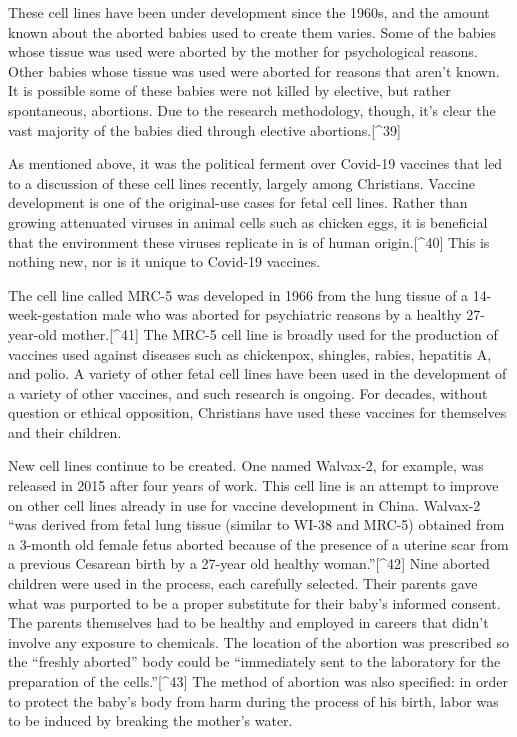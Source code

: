 \documentclass[
]{book}
\begin{document}
These cell lines have been under development since the 1960s, and the amount known about the aborted babies used to create them varies. Some of the babies whose tissue was used were aborted by the mother for psychological reasons. Other babies whose tissue was used were aborted for reasons that aren't known. It is possible some of these babies were not killed by elective, but rather spontaneous, abortions. Due to the research methodology, though, it's clear the vast majority of the babies died through elective abortions.{[}\^{}39{]}

As mentioned above, it was the political ferment over Covid-19 vaccines that led to a discussion of these cell lines recently, largely among Christians. Vaccine development is one of the original-use cases for fetal cell lines. Rather than growing attenuated viruses in animal cells such as chicken eggs, it is beneficial that the environment these viruses replicate in is of human origin.{[}\^{}40{]} This is nothing new, nor is it unique to Covid-19 vaccines.

The cell line called MRC-5 was developed in 1966 from the lung tissue of a 14-week-gestation male who was aborted for psychiatric reasons by a healthy 27-year-old mother.{[}\^{}41{]} The MRC-5 cell line is broadly used for the production of vaccines used against diseases such as chickenpox, shingles, rabies, hepatitis A, and polio. A variety of other fetal cell lines have been used in the development of a variety of other vaccines, and such research is ongoing. For decades, without question or ethical opposition, Christians have used these vaccines for themselves and their children.

New cell lines continue to be created. One named Walvax-2, for example, was released in 2015 after four years of work. This cell line is an attempt to improve on other cell lines already in use for vaccine development in China. Walvax-2 ``was derived from fetal lung tissue (similar to WI-38 and MRC-5) obtained from a 3-month old female fetus aborted because of the presence of a uterine scar from a previous Cesarean birth by a 27-year old healthy woman.''{[}\^{}42{]} Nine aborted children were used in the process, each carefully selected. Their parents gave what was purported to be a proper substitute for their baby's informed consent. The parents themselves had to be healthy and employed in careers that didn't involve any exposure to chemicals. The location of the abortion was prescribed so the ``freshly aborted'' body could be ``immediately sent to the laboratory for the preparation of the cells.''{[}\^{}43{]} The method of abortion was also specified: in order to protect the baby's body from harm during the process of his birth, labor was to be induced by breaking the mother's water.
\end{document}
